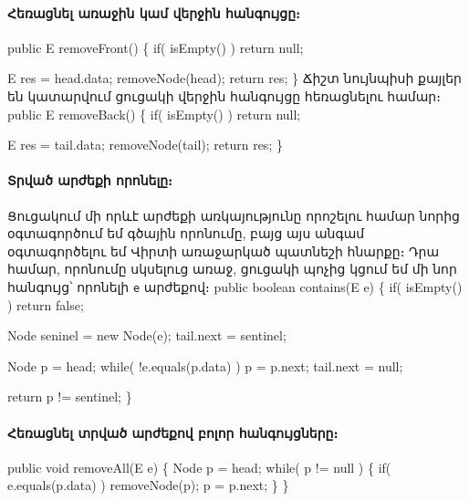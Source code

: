 %
%
\paragraph{Հեռացնել առաջին կամ վերջին հանգույցը։}
\nwenddocs{}\endmoddef{}
public E removeFront()
\{
  if( isEmpty() )
    return null;

  E res = head.data;
  removeNode(head);
  return res;
\}
\nwendcode{}\nwdocspar
Ճիշտ նույնպիսի քայլեր են կատարվում ցուցակի վերջին հանգույցը
հեռացնելու համար։
\nwenddocs{}\endmoddef{}
public E removeBack()
\{
  if( isEmpty() )
    return null;

  E res = tail.data;
  removeNode(tail);
  return res;
\}
\nwendcode{}\nwdocspar


%
%
\paragraph{Տրված արժեքի որոնելը։}
Ցուցակում մի որևէ արժեքի առկայությունը որոշելու համար նորից 
օգտագործում եմ գծային որոնումը, բայց այս անգամ օգտագործելու 
եմ Վիրտի առաջարկած պատնեշի հնարքը։ Դրա համար, որոնումը 
սկսելուց առաջ, ցուցակի պոչից կցում եմ մի նոր հանգույց՝ որոնելի 
\texttt{e} արժեքով։  
\nwenddocs{}\endmoddef{}
public boolean contains(E e)
\{
  if( isEmpty() )
    return false;

  Node seninel = new Node(e);
  tail.next = sentinel;

  Node p = head;
  while( !e.equals(p.data) )
    p = p.next;
  tail.next = null;

  return p != sentinel;
\}
\nwendcode{}\nwdocspar

%
%
\paragraph{Հեռացնել տրված արժեքով բոլոր հանգույցները։}
\nwenddocs{}\endmoddef{}
public void removeAll(E e)
\{
  Node p = head;
  while( p != null ) \{
    if( e.equals(p.data) )
      removeNode(p);
    p = p.next;
  \}    
\}
\nwendcode{}\nwdocspar

